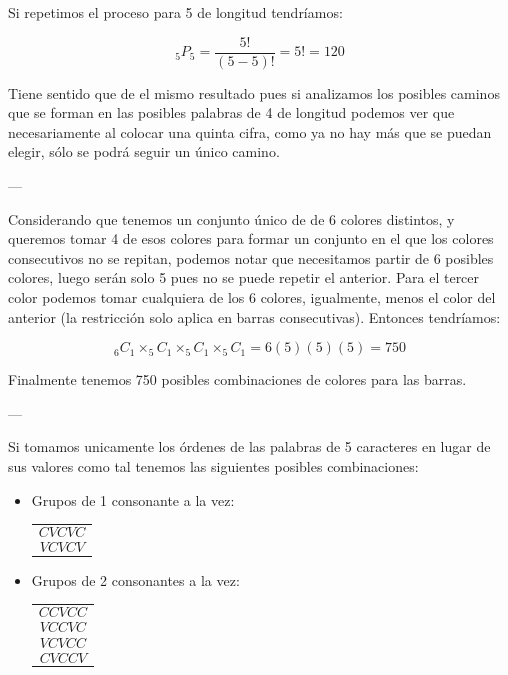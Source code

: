\documentclass{article}
\begin{document}
Si repetimos el proceso para 5 de longitud tendríamos:

$$_5P_5 = \dfrac{5!}{(5-5)!} = 5! = 120$$

Tiene sentido que de el mismo resultado pues si analizamos los posibles caminos que se forman en las posibles palabras de 4 de longitud podemos ver que necesariamente al colocar una quinta cifra, como ya no hay más que se puedan elegir, sólo se podrá seguir un único camino.

---


Considerando que tenemos un conjunto único de de 6 colores distintos, y queremos tomar 4 de esos colores para formar un conjunto en el que los colores consecutivos no se repitan, podemos notar que necesitamos partir de 6 posibles colores, luego serán solo 5 pues no se puede repetir el anterior. Para el tercer color podemos tomar cualquiera de los 6 colores, igualmente, menos el color del anterior (la restricción solo aplica en barras consecutivas). Entonces tendríamos:

$$_6C_1 \times _5C_1 \times _5C_1 \times _5C_1 = 6(5)(5)(5) = 750$$

Finalmente tenemos 750 posibles combinaciones de colores para las barras.

---


Si tomamos unicamente los órdenes de las palabras de 5 caracteres en lugar de sus valores como tal tenemos las siguientes posibles combinaciones:

\begin{itemize}
    \item Grupos de 1 consonante a la vez:

        \begin{tabular}{c}
            $$CVCVC$$ \\
            $$VCVCV$$ \\
        \end{tabular}

    \item Grupos de 2 consonantes a la vez:

        \begin{tabular}{c}
            $$CCVCC$$ \\
            $$VCCVC$$ \\
            $$VCVCC$$ \\
            $$CVCCV$$ \\
        \end{tabular}
\end{itemize}
\end{document}
